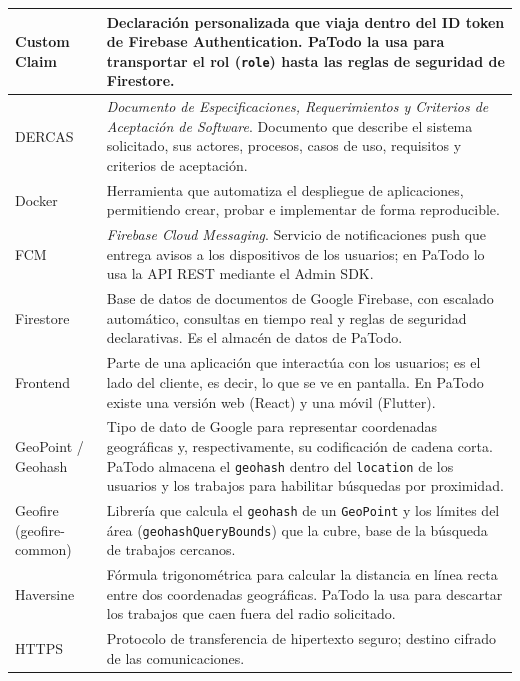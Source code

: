 \documentclass[doc,12pt,a4paper]{apa7}
\begin{document}
\begin{longtable}{|P{3.3cm}|L{11.2cm}|}
Custom Claim & Declaración personalizada que viaja dentro del ID token de Firebase Authentication. PaTodo la usa para transportar el rol (\texttt{role}) hasta las reglas de seguridad de Firestore. \\ \hline

DERCAS & \textit{Documento de Especificaciones, Requerimientos y Criterios de Aceptación de Software}. Documento que describe el sistema solicitado, sus actores, procesos, casos de uso, requisitos y criterios de aceptación. \\ \hline

Docker & Herramienta que automatiza el despliegue de aplicaciones, permitiendo crear, probar e implementar de forma reproducible. \\ \hline

FCM & \textit{Firebase Cloud Messaging}. Servicio de notificaciones push que entrega avisos a los dispositivos de los usuarios; en PaTodo lo usa la API REST mediante el Admin SDK. \\ \hline

Firestore & Base de datos de documentos de Google Firebase, con escalado automático, consultas en tiempo real y reglas de seguridad declarativas. Es el almacén de datos de PaTodo. \\ \hline

Frontend & Parte de una aplicación que interactúa con los usuarios; es el lado del cliente, es decir, lo que se ve en pantalla. En PaTodo existe una versión web (React) y una móvil (Flutter). \\ \hline

GeoPoint / Geohash & Tipo de dato de Google para representar coordenadas geográficas y, respectivamente, su codificación de cadena corta. PaTodo almacena el \texttt{geohash} dentro del \texttt{location} de los usuarios y los trabajos para habilitar búsquedas por proximidad. \\ \hline

Geofire (geofire-common) & Librería que calcula el \texttt{geohash} de un \texttt{GeoPoint} y los límites del área (\texttt{geohashQueryBounds}) que la cubre, base de la búsqueda de trabajos cercanos. \\ \hline

Haversine & Fórmula trigonométrica para calcular la distancia en línea recta entre dos coordenadas geográficas. PaTodo la usa para descartar los trabajos que caen fuera del radio solicitado. \\ \hline

HTTPS & Protocolo de transferencia de hipertexto seguro; destino cifrado de las comunicaciones. \\ \hline


\end{longtable}
\end{document}
